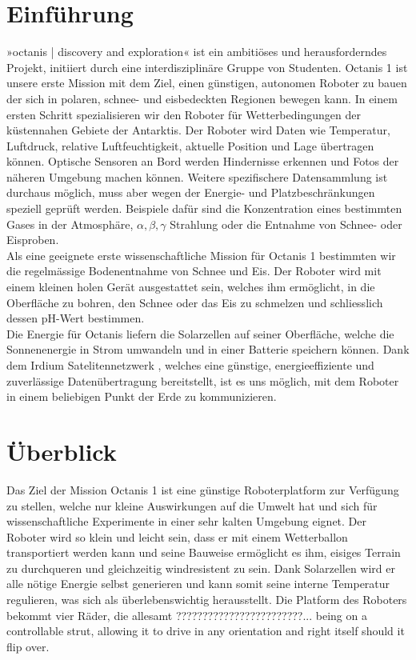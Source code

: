 \documentclass[a4paper,12pt]{article}
\begin{document}
\tableofcontents

\pagebreak

\section{Einführung}
»octanis | discovery and exploration« \cite{octanis} ist ein ambitiöses und herausforderndes Projekt, initiiert durch eine interdisziplinäre Gruppe von Studenten. Octanis 1 ist unsere erste Mission mit dem Ziel, einen günstigen, autonomen Roboter zu bauen der sich in polaren, schnee- und eisbedeckten Regionen bewegen kann. In einem ersten Schritt spezialisieren wir den Roboter für Wetterbedingungen der küstennahen Gebiete der Antarktis. Der Roboter wird Daten wie Temperatur, Luftdruck, relative Luftfeuchtigkeit, aktuelle Position und Lage übertragen können. Optische Sensoren an Bord werden Hindernisse erkennen und Fotos der näheren Umgebung machen können. Weitere spezifischere Datensammlung ist durchaus möglich, muss aber wegen der Energie- und Platzbeschränkungen speziell geprüft werden. Beispiele dafür sind die Konzentration eines bestimmten Gases in der Atmosphäre, $\alpha, \beta, \gamma$ Strahlung oder die Entnahme von Schnee- oder Eisproben. \\
Als eine geeignete erste wissenschaftliche Mission für Octanis 1 \cite{krishnakant} bestimmten wir die regelmässige Bodenentnahme von Schnee und Eis. Der Roboter wird mit einem kleinen holen Gerät ausgestattet sein, welches ihm ermöglicht, in die Oberfläche zu bohren, den Schnee oder das Eis zu schmelzen und schliesslich dessen pH-Wert bestimmen.\\ 
Die Energie für Octanis liefern die Solarzellen auf seiner Oberfläche, welche die Sonnenenergie in Strom umwandeln und in einer Batterie speichern können. Dank dem Irdium Satelitennetzwerk \cite{iridium}, welches eine günstige, energieeffiziente und zuverlässige Datenübertragung bereitstellt, ist es uns möglich, mit dem Roboter in einem beliebigen Punkt der Erde zu kommunizieren.


\section{Überblick}

Das Ziel der Mission Octanis 1 ist eine günstige Roboterplatform zur Verfügung zu stellen, welche nur kleine Auswirkungen auf die Umwelt hat und sich für wissenschaftliche Experimente in einer sehr kalten Umgebung eignet. Der Roboter wird so klein und leicht sein, dass er mit einem Wetterballon transportiert werden kann und seine Bauweise ermöglicht es ihm, eisiges Terrain zu durchqueren und gleichzeitig windresistent zu sein. Dank Solarzellen wird er alle nötige Energie selbst generieren und kann somit seine interne Temperatur regulieren, was sich als überlebenswichtig herausstellt. Die Platform des Roboters bekommt vier Räder, die allesamt ????????????????????????... being on a controllable strut, allowing it to drive in any orientation and right itself should it flip over. 
\end{document}
